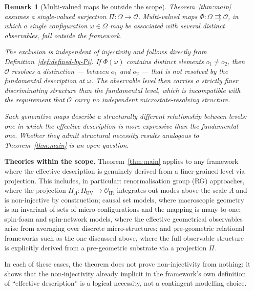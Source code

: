 \documentclass[12pt,a4paper]{article}
\newtheorem{remark}{Remark}
\begin{document}
  \begin{remark}[Multi-valued maps lie outside the scope]
    \label{rem:multivalued}
    Theorem~\ref{thm:main} assumes a single-valued surjection
    $\Pi : \Omega \to \mathcal{O}$.
    Multi-valued maps $\Phi : \Omega \rightrightarrows \mathcal{O}$,
    in which a single configuration $\omega \in \Omega$ may be associated
    with several distinct observables, fall outside the framework.

    The exclusion is independent of injectivity and follows directly from
    Definition~\ref{def:defined-by-Pi}.
    If $\Phi(\omega)$ contains distinct elements $o_1 \neq o_2$, then
    $\mathcal{O}$ resolves a distinction --- between $o_1$ and $o_2$ ---
    that is not resolved by the fundamental description at $\omega$.
    The observable level then carries a strictly finer discriminating
    structure than the fundamental level, which is incompatible with the
    requirement that $\mathcal{O}$ carry no independent microstate-resolving
    structure.

    Such generative maps describe a structurally different relationship
    between levels: one in which the effective description is more
    expressive than the fundamental one.
    Whether they admit structural necessity results analogous to
    Theorem~\ref{thm:main} is an open question.
  \end{remark}

  \textbf{Theories within the scope.}
  Theorem~\ref{thm:main} applies to any framework where the effective description
  is genuinely derived from a finer-grained level via projection.
  This includes, in particular:
  renormalisation group (RG) approaches, where the projection
  $\Pi_\Lambda : \Omega_\mathrm{UV} \to \mathcal{O}_\mathrm{IR}$ integrates out
  modes above the scale $\Lambda$ and is non-injective by construction;
  causal set models, where macroscopic geometry is an invariant of sets of
  micro-configurations and the mapping is many-to-one;
  spin-foam and spin-network models, where the effective geometrical observables
  arise from averaging over discrete micro-structures;
  and pre-geometric relational frameworks such as the one discussed above, where the
  full observable structure is explicitly derived from a pre-geometric substrate
  via a projection $\Pi$.

  In each of these cases, the theorem does not prove non-injectivity from nothing:
  it shows that the non-injectivity already implicit in the framework's own
  definition of ``effective description'' is a logical necessity, not a contingent
  modelling choice.
\end{document}
